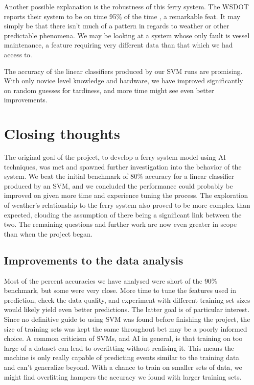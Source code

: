 \documentclass[11pt]{article} %
\begin{document}
Another possible explanation is the robustness of this ferry system. The  
WSDOT reports their system to be on time 95\% of the time \cite{wsdotComparison},
a remarkable feat. It may simply be that there isn't much of a pattern in regards
to weather or other predictable phenomena. We may be looking at a system whose
only fault is vessel maintenance, a feature requiring very different data than
that which we had access to. 

The accuracy of the linear classifiers produced by our SVM runs are promising.
With only novice level knowledge and hardware, we have improved significantly on
random guesses for tardiness, and more time might see even better improvements.

\section{Closing thoughts}
\label{sec:summary}
The original goal of the project, to develop a ferry system model using AI 
techniques, was met and spawned further investigation into the behavior of the
system. We beat the initial benchmark of $80\%$ accuracy for a linear classifier 
produced by an SVM, and we concluded the performance could probably be improved
on given more time and experience tuning the process. The exploration of weather's
relationship to the ferry system also proved to be more complex than expected, 
clouding the assumption of there being a significant link between the two. The 
remaining questions and further work are now even greater in scope than when
the project began.


\subsection{Improvements to the data analysis}
\label{sec:improvements}
Most of the percent accuracies we have analysed were short of the $90\%$ benchmark,
but some were very close. More time to tune the features used in prediction, 
check the data quality, and experiment with different training set sizes would
likely yield even better predictions. The latter goal is of particular interest.
Since no definitive guide to using SVM was found before finishing the project, 
the size of training sets was kept the same throughout bet may be a poorly informed
choice. A common criticism of SVMs, and AI in general, is that training on too
large of a dataset can lead to overfitting without realising it. This means the
machine is only really capable of predicting events similar to the training data
and can't generalize beyond. With a chance to train on smaller sets of data,
we might find overfitting hampers the accuracy we found with larger training sets.
\end{document}
